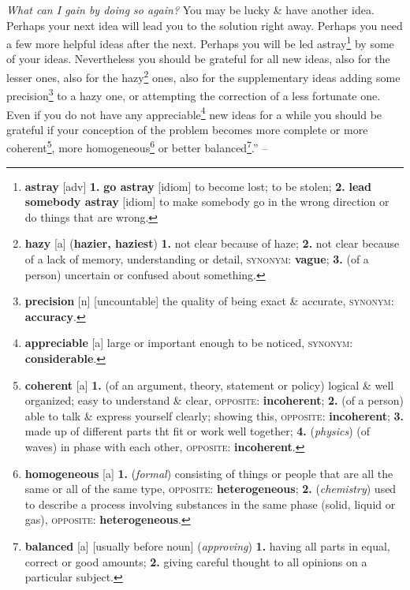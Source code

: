 \documentclass[oneside]{book}
\numberwithin{equation}{section}
\begin{document}
\textit{What can I gain by doing so again?} You may be lucky \& have another idea. Perhaps your next idea will lead you to the solution right away. Perhaps you need a few more helpful ideas after the next. Perhaps you will be led astray\footnote{\textbf{astray} [adv] \textbf{1.} \textbf{go astray} [idiom] to become lost; to be stolen; \textbf{2.} \textbf{lead somebody astray} [idiom] to make somebody go in the wrong direction or do things that are wrong.} by some of your ideas. Nevertheless you should be grateful for all new ideas, also for the lesser ones, also for the hazy\footnote{\textbf{hazy} [a] (\textbf{hazier, haziest}) \textbf{1.} not clear because of haze; \textbf{2.} not clear because of a lack of memory, understanding or detail, \textsc{synonym}: \textbf{vague}; \textbf{3.} (of a person) uncertain or confused about something.} ones, also for the supplementary ideas adding some precision\footnote{\textbf{precision} [n] [uncountable] the quality of being exact \& accurate, \textsc{synonym}: \textbf{accuracy}.} to a hazy one, or attempting the correction of a less fortunate one. Even if you do not have any appreciable\footnote{\textbf{appreciable} [a] large or important enough to be noticed, \textsc{synonym}: \textbf{considerable}.} new ideas for a while you should be grateful if your conception of the problem becomes more complete or more coherent\footnote{\textbf{coherent} [a] \textbf{1.} (of an argument, theory, statement or policy) logical \& well organized; easy to understand \& clear, \textsc{opposite}: \textbf{incoherent}; \textbf{2.} (of a person) able to talk \& express yourself clearly; showing this, \textsc{opposite}: \textbf{incoherent}; \textbf{3.} made up of different parts tht fit or work well together; \textbf{4.} (\textit{physics}) (of waves) in phase with each other, \textsc{opposite}: \textbf{incoherent}.}, more homogeneous\footnote{\textbf{homogeneous} [a] \textbf{1.} (\textit{formal}) consisting of things or people that are all the same or all of the same type, \textsc{opposite}: \textbf{heterogeneous}; \textbf{2.} (\textit{chemistry}) used to describe a process involving substances in the same phase (solid, liquid or gas), \textsc{opposite}: \textbf{heterogeneous}.} or better balanced\footnote{\textbf{balanced} [a] [usually before noun] (\textit{approving}) \textbf{1.} having all parts in equal, correct or good amounts; \textbf{2.} giving careful thought to all opinions on a particular subject.}.'' -- \cite[pp. 33--35]{Polya2014}
\end{document}
